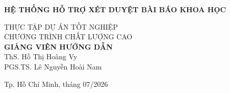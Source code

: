 \begin{titlepage}
\begin{center}

{ \Large \bfseries HỆ THỐNG HỖ TRỢ XÉT DUYỆT BÀI BÁO KHOA HỌC\\[1.5cm] } 


\large THỰC TẬP DỰ ÁN TỐT NGHIỆP\\
\large CHƯƠNG TRÌNH CHẤT LƯỢNG CAO\\[2cm]

\textbf{GIẢNG VIÊN HƯỚNG DẪN}\\
ThS. Hồ Thị Hoàng Vy\\
PGS.TS. Lê Nguyễn Hoài Nam


\vfill
Tp. Hồ Chí Minh, tháng 07/2026

\end{center}
\end{titlepage}
